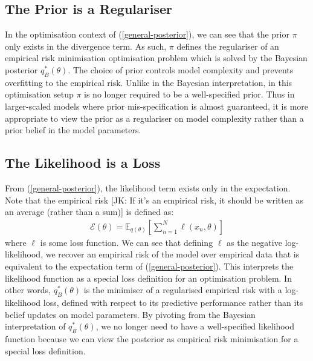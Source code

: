 \documentclass[twoside,11pt]{article}
\newcommand{\jk}[1]{{\color{blue} [JK: #1]}}
\begin{document}
\subsection{The Prior is a Regulariser}
In the optimisation context of (\ref{general-posterior}), we can see that the prior $\pi$ only exists in the divergence term. As such, $\pi$ defines the regulariser of an empirical risk minimisation optimisation problem which is solved by the Bayesian posterior $q_B^*(\theta)$. The choice of prior controls model complexity and prevents overfitting to the empirical risk. Unlike in the Bayesian interpretation, in this optimisation setup $\pi$ is no longer required to be a well-specified prior. Thus in larger-scaled models where prior mis-specification is almost guaranteed, it is more appropriate to view the prior as a regulariser on model complexity rather than a prior belief in the model parameters.

\subsection{The Likelihood is a Loss}
From (\ref{general-posterior}), the likelihood term exists only in the expectation. Note that the empirical risk \jk{If it's an empirical risk, it should be written as an average (rather than a sum)} is defined as:
\begin{align}
\mathcal{E}(\theta) = \mathbb{E}_{q(\theta)}\left[\sum_{n=1}^N \ell\left(x_n, \theta\right)\right]
\label{empirical-risk}
\end{align}
where $\ell$ is some loss function. We can see that defining $\ell$ as the negative log-likelihood, we recover an empirical risk of the model over empirical data that is equivalent to the expectation term of (\ref{general-posterior}). This interprets the likelihood function as a special loss definition for an optimisation problem. In other words, $q_B^*(\theta)$ is the minimiser of a regularised empirical risk with a log-likelihood loss, defined with respect to its predictive performance rather than its belief updates on model parameters. By pivoting from the Bayesian interpretation of $q_B^*(\theta)$, we no longer need to have a well-specified likelihood function because we can view the posterior as empirical risk minimisation for a special loss definition.
\end{document}
